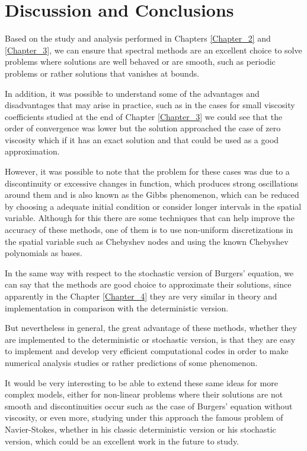 \chapter{Discussion and Conclusions}

	Based on the study and analysis performed in Chapters \ref{Chapter_2} and \ref{Chapter_3}, we can ensure that spectral methods are an excellent choice to solve problems where solutions are well behaved or are smooth, such as periodic problems or rather solutions that vanishes at bounds. 
	
	In addition, it was possible to understand some of the advantages and disadvantages that may arise in practice, such as in the cases for small viscosity coefficients studied at the end of Chapter \ref{Chapter_3} we could see that the order of convergence was lower but the solution approached the case of zero viscosity which if it has an exact solution and that could be used as a good approximation. 
	
	However, it was possible to note that the problem for these cases was due to a discontinuity or excessive changes in function, which produces strong oscillations around them and is also known as the Gibbs phenomenon, which can be reduced by choosing a adequate initial condition or consider longer intervals in the spatial variable. Although for this there are some techniques that can help improve the accuracy of these methods, one of them is to use non-uniform discretizations in the spatial variable such as Chebyshev nodes and using the known Chebyshev polynomials as bases. 
	
	In the same way with respect to the stochastic version of Burgers' equation, we can say that the methods are good choice to approximate their solutions, since apparently in the Chapter \ref{Chapter_4} they are very similar in theory and implementation in comparison with the deterministic version. 
	
	But nevertheless in general, the great advantage of these methods, whether they are implemented to the deterministic or stochastic version, is that they are easy to implement and develop very efficient computational codes in order to make numerical analysis studies or rather predictions of some phenomenon. 
	
	It would be very interesting to be able to extend these same ideas for more complex models, either for non-linear problems where their solutions are not smooth and discontinuities occur such as the case of Burgers' equation without viscosity, or even more, studying under this approach the famous problem of Navier-Stokes, whether in his classic deterministic version or his stochastic version, which could be an excellent work in the future to study.
	